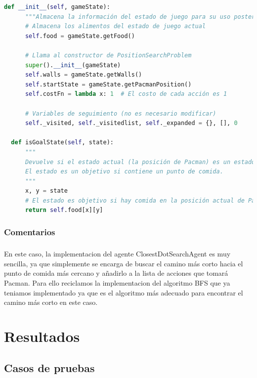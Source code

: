 \documentclass{report}
\begin{document}
\begin{lstlisting}[language=Python, caption=Implementación final del problema de las esquinas]
  def __init__(self, gameState):
      """Almacena la información del estado de juego para su uso posterior."""
      # Almacena los alimentos del estado de juego actual
      self.food = gameState.getFood()

      # Llama al constructor de PositionSearchProblem
      super().__init__(gameState)
      self.walls = gameState.getWalls()
      self.startState = gameState.getPacmanPosition()
      self.costFn = lambda x: 1  # El costo de cada acción es 1

      # Variables de seguimiento (no es necesario modificar)
      self._visited, self._visitedlist, self._expanded = {}, [], 0

  def isGoalState(self, state):
      """
      Devuelve si el estado actual (la posición de Pacman) es un estado objetivo.
      El estado es un objetivo si contiene un punto de comida.
      """
      x, y = state
      # El estado es objetivo si hay comida en la posición actual de Pacman
      return self.food[x][y]
          \end{lstlisting}
        \subsection*{Comentarios}
          \paragraph*{}{
            En este caso, la implementacion del agente ClosestDotSearchAgent es muy sencilla, ya que simplemente se encarga de buscar el camino más corto hacia el punto de comida más cercano y añadirlo a la lista de acciones que tomará Pacman.
            Para ello reciclamos la implementacion del algoritmo BFS que ya teniamos implementado ya que es el algoritmo más adecuado para encontrar el camino más corto en este caso.\\
          }
    \chapter{Resultados}
      \section{Casos de pruebas}
\end{document}
